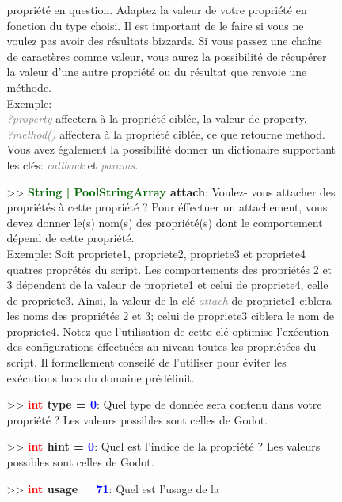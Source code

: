 \documentclass[a4paper, 11pt]{article}
\begin{document}
\begin{description}
\begin{itemize}
\begin{itemize}
				propriété en question. Adaptez la valeur de votre propriété en fonction du type choisi. Il 
				est important de le faire si vous ne voulez pas avoir des résultats bizzards. Si vous passez
				une chaîne de caractères comme valeur, vous aurez la possibilité de récupérer la valeur
				d'une autre propriété ou du résultat que renvoie une méthode. \\Exemple:\\ 
				\textit{\textcolor{gray}{?property}} affectera à la propriété ciblée, la valeur de property.
				\\ \textit{\textcolor {gray}{?method()}} affectera à la propriété ciblée, ce que retourne 
				method.\\Vous avez également la possibilité donner un dictionaire supportant les clés:
				\textit{\textcolor {gray}{callback}} et \textit{\textcolor {gray}{params}}.\\
				\newpage \item[>> \textbf{\textcolor{darkgreen}{String | PoolStringArray} attach}:] Voulez-
				vous attacher des propriétés à cette propriété ? Pour éffectuer un attachement, vous devez 
				donner le(s) nom(s) des propriété(s) dont le comportement dépend de cette propriété.\\ 
				Exemple: Soit propriete1, propriete2, propriete3 et propriete4 quatres proprétés du script. 
				Les comportements des propriétés 2 et 3 dépendent de la valeur de propriete1 et celui de 
				propriete4, celle de propriete3. Ainsi, la valeur de la clé \textit{\textcolor {gray}
				{attach}} de propriete1 ciblera les noms des propriétés 2 et 3; celui de propriete3 ciblera 
				le nom de propriete4. Notez que l'utilisation de cette clé optimise l'exécution des
				configurations éffectuées au niveau toutes les propriétées du script. Il formellement 
				conseilé de l'utiliser pour éviter les exécutions hors du domaine prédéfinit.\\
				\item[>> \textbf{\textcolor{red}{int} type = \textcolor{blue}{0}}:] Quel type de donnée sera 
				contenu dans votre propriété ? Les valeurs possibles sont celles de Godot.\\
				\item[>> \textbf{\textcolor{red}{int} hint = \textcolor{blue}{0}}:] Quel est l'indice de la
				propriété ? Les valeurs possibles sont celles de Godot.\\
				\item[>> \textbf{\textcolor{red}{int} usage = \textcolor{blue}{71}}:] Quel est l'usage de la

\end{itemize}
\end{itemize}
\end{description}
\end{document}
